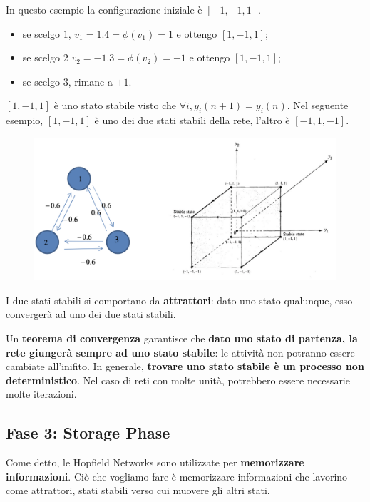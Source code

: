 In questo esempio la configurazione iniziale è $[-1,-1,1]$.
\begin{itemize}
    \item se scelgo $1$, $v_1=1.4=\phi(v_1)=1$ e ottengo $[1,-1,1]$;
    \item se scelgo $2$  $v_2=-1.3=\phi(v_2)=-1$ e ottengo $[1,-1,1]$;
    \item se scelgo $3$, rimane a $+1$.
\end{itemize}
$[1,-1,1]$ è uno stato stabile visto che $\forall i,y_i(n+1)=y_i(n)$.
\newpage
Nel seguente esempio, $[1,-1,1]$ è uno dei due stati stabili della rete, l'altro è $[-1,1,-1]$.
\begin{figure}[!h]
    \includegraphics[scale=.5]{images/hopfield_networks/ex02.png}
    \centering
\end{figure}


I due stati stabili si comportano da \textbf{attrattori}: dato uno stato qualunque, esso convergerà ad uno dei due stati stabili.


Un \textbf{teorema di convergenza} garantisce che \textbf{dato uno stato di partenza, la rete giungerà sempre ad uno stato stabile}: le attività non potranno essere cambiate all'inifito.
\newline
\newline
In generale, \textbf{trovare uno stato stabile è un processo non deterministico}. Nel caso di reti con molte unità, potrebbero essere necessarie molte iterazioni.

\subsection{Fase 3: Storage Phase}
Come detto, le Hopfield Networks sono utilizzate per \textbf{memorizzare informazioni}. Ciò che vogliamo fare è memorizzare informazioni che lavorino come attrattori, stati stabili verso cui muovere gli altri stati.


